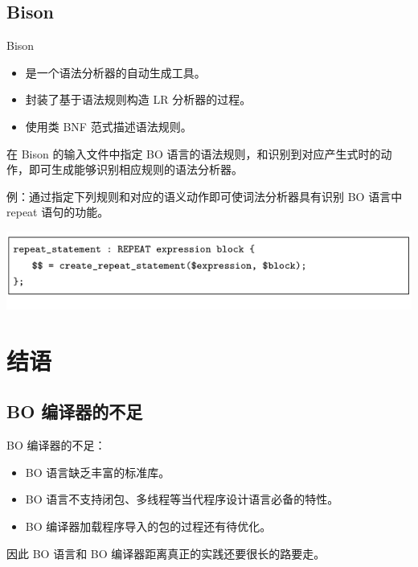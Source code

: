 \documentclass[dvipsnames, svgnames, x11names]{beamer}
\begin{document}
\subsection{Bison}
\begin{frame}{Bison}
    \begin{itemize}[<+->]
        \item 是一个语法分析器的自动生成工具。
        \item 封装了基于语法规则构造 LR 分析器的过程。
        \item 使用类 BNF 范式描述语法规则。
    \end{itemize}

    \vspace{\baselineskip}
    \onslide<+-> 在 Bison 的输入文件中指定 BO 语言的语法规则，和识别到对应产生式时的动作，即可生成能够识别相应规则的语法分析器。
    
    \vspace{\baselineskip}
    \onslide<+-> 例：通过指定下列规则和对应的语义动作即可使词法分析器具有识别 BO 语言中 repeat 语句的功能。

    \begin{center}
        \onslide<+->\includegraphics{../figure/bison1.pdf}
    \end{center}
\end{frame}


\section{结语}
\subsection{BO 编译器的不足}
\begin{frame}
    \onslide<+-> BO 编译器的不足：
    
    \begin{itemize}[<+->]
        \item BO 语言缺乏丰富的标准库。
        \item BO 语言不支持闭包、多线程等当代程序设计语言必备的特性。
        \item BO 编译器加载程序导入的包的过程还有待优化。
    \end{itemize}

    \onslide<+-> 因此 BO 语言和 BO 编译器距离真正的实践还要很长的路要走。
\end{frame}
\end{document}
